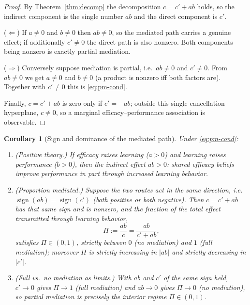 \documentclass{amsart}
\newtheorem{corollary}{Corollary}
\theoremstyle{definition}
\begin{document}
\begin{proof}
By Theorem~\ref{thm:decomp} the decomposition $c=c'+ab$ holds, so the indirect
component is the single number $ab$ and the direct component is $c'$.

($\Leftarrow$) If $a\neq0$ and $b\neq0$ then $ab\neq0$, so the mediated path
carries a genuine effect; if additionally $c'\neq0$ the direct path is also
nonzero. Both components being nonzero is exactly partial mediation.

($\Rightarrow$) Conversely suppose mediation is partial, i.e.\ $ab\neq0$ and
$c'\neq0$. From $ab\neq0$ we get $a\neq0$ and $b\neq0$ (a product is nonzero iff
both factors are). Together with $c'\neq0$ this is \eqref{eq:pm-cond}.

Finally, $c=c'+ab$ is zero only if $c'=-ab$; outside this single cancellation
hyperplane, $c\neq0$, so a marginal efficacy--performance association is
observable.
\end{proof}

\begin{corollary}[Sign and dominance of the mediated path]\label{cor:sign}
Under \eqref{eq:pm-cond}:
\begin{enumerate}
\item \emph{(Positive theory.)} If efficacy raises learning ($a>0$) and learning
raises performance ($b>0$), then the indirect effect $ab>0$: shared efficacy
beliefs improve performance \emph{in part through} increased learning behavior.
\item \emph{(Proportion mediated.)} Suppose the two routes act in the same
direction, i.e.\ $\operatorname{sign}(ab)=\operatorname{sign}(c')$ (both
positive or both negative). Then $c=c'+ab$ has that same sign and is nonzero,
and the fraction of the total effect transmitted through learning behavior,
\[
\Pi:=\frac{ab}{c}=\frac{ab}{c'+ab},
\]
satisfies $\Pi\in(0,1)$, strictly between $0$ (no mediation) and $1$ (full
mediation); moreover $\Pi$ is strictly increasing in $|ab|$ and strictly
decreasing in $|c'|$.
\item \emph{(Full vs.\ no mediation as limits.)} With $ab$ and $c'$ of the same
sign held, $c'\to0$ gives $\Pi\to1$ (full mediation) and $ab\to0$ gives
$\Pi\to0$ (no mediation), so partial mediation is precisely the interior
regime $\Pi\in(0,1)$.
\end{enumerate}
\end{corollary}
\end{document}
